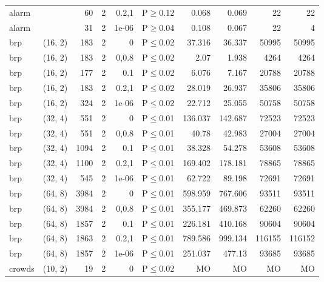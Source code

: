 \begin{longtable}{llrrrlrrrr}
 alarm         &          &     	60 &   2 & 0.2,1 & P$\geq$0.12  & 0.068   & 0.069    & 22     & 22     \\
 alarm         &          &     	31 &   2 & 1e-06 & P$\geq$0.04  & 0.108   & 0.067    & 22     & 4      \\
 brp           & (16, 2)  &    	183 &   2 & 0     & P$\leq$0.02  & 37.316  & 36.337   & 50995  & 50995  \\
 brp           & (16, 2)  &    	183 &   2 & 0,0.8 & P$\leq$0.02  & 2.07    & 1.938    & 4264   & 4264   \\
 brp           & (16, 2)  &    	177 &   2 & 0.1   & P$\leq$0.02  & 6.076   & 7.167    & 20788  & 20788  \\
 brp           & (16, 2)  &    	183 &   2 & 0.2,1 & P$\leq$0.02  & 28.019  & 26.937   & 35806  & 35806  \\
 brp           & (16, 2)  &    	324 &   2 & 1e-06 & P$\leq$0.02  & 22.712  & 25.055   & 50758  & 50758  \\
 brp           & (32, 4)  &    	551 &   2 & 0     & P$\leq$0.01  & 136.037 & 142.687  & 72523  & 72523  \\
 brp           & (32, 4)  &    	551 &   2 & 0,0.8 & P$\leq$0.01  & 40.78   & 42.983   & 27004  & 27004  \\
 brp           & (32, 4)  &   	1094 &   2 & 0.1   & P$\leq$0.01  & 38.328  & 54.278   & 53608  & 53608  \\
 brp           & (32, 4)  &   	1100 &   2 & 0.2,1 & P$\leq$0.01  & 169.402 & 178.181  & 78865  & 78865  \\
 brp           & (32, 4)  &    	545 &   2 & 1e-06 & P$\leq$0.01  & 62.722  & 89.198   & 72691  & 72691  \\
 brp           & (64, 8)  &   	3984 &   2 & 0     & P$\leq$0.01  & 598.959 & 767.606  & 93511  & 93511  \\
 brp           & (64, 8)  &   	3984 &   2 & 0,0.8 & P$\leq$0.01  & 355.177 & 469.873  & 62260  & 62260  \\
 brp           & (64, 8)  &   	1857 &   2 & 0.1   & P$\leq$0.01  & 226.181 & 410.168  & 90604  & 90604  \\
 brp           & (64, 8)  &   	1863 &   2 & 0.2,1 & P$\leq$0.01  & 789.586 & 999.134  & 116155 & 116152 \\
 brp           & (64, 8)  &   	1857 &   2 & 1e-06 & P$\leq$0.01  & 251.037 & 477.13   & 93685  & 93685  \\
 crowds        & (10, 2)  &     	19 &   2 & 0     & P$\leq$0.02  & MO      & MO       & MO     & MO     \\

\end{longtable}
